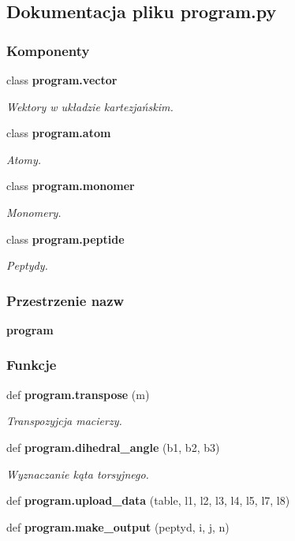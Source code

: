 \subsection{Dokumentacja pliku program.\+py}
\label{program_8py}
\subsubsection*{Komponenty}
\begin{DoxyCompactItemize}
\item 
class \textbf{ program.\+vector}
\begin{DoxyCompactList}\small\item\em Wektory w układzie kartezjańskim. \end{DoxyCompactList}\item 
class \textbf{ program.\+atom}
\begin{DoxyCompactList}\small\item\em Atomy. \end{DoxyCompactList}\item 
class \textbf{ program.\+monomer}
\begin{DoxyCompactList}\small\item\em Monomery. \end{DoxyCompactList}\item 
class \textbf{ program.\+peptide}
\begin{DoxyCompactList}\small\item\em Peptydy. \end{DoxyCompactList}\end{DoxyCompactItemize}
\subsubsection*{Przestrzenie nazw}
\begin{DoxyCompactItemize}
\item 
 \textbf{ program}
\end{DoxyCompactItemize}
\subsubsection*{Funkcje}
\begin{DoxyCompactItemize}
\item 
def \textbf{ program.\+transpose} (m)
\begin{DoxyCompactList}\small\item\em Transpozyjcja macierzy. \end{DoxyCompactList}\item 
def \textbf{ program.\+dihedral\+\_\+angle} (b1, b2, b3)
\begin{DoxyCompactList}\small\item\em Wyznaczanie kąta torsyjnego. \end{DoxyCompactList}\item 
def \textbf{ program.\+upload\+\_\+data} (table, l1, l2, l3, l4, l5, l7, l8)
\item 
def \textbf{ program.\+make\+\_\+output} (peptyd, i, j, n)
\end{DoxyCompactItemize}
